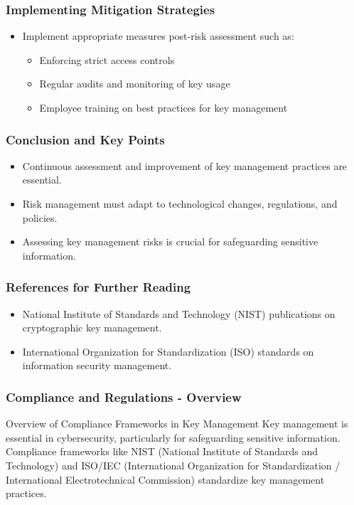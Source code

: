 \documentclass{beamer}
\begin{document}
\begin{frame}[fragile]
    \frametitle{Implementing Mitigation Strategies}
    \begin{itemize}
        \item Implement appropriate measures post-risk assessment such as:
        \begin{itemize}
            \item Enforcing strict access controls
            \item Regular audits and monitoring of key usage
            \item Employee training on best practices for key management
        \end{itemize}
    \end{itemize}
\end{frame}

\begin{frame}[fragile]
    \frametitle{Conclusion and Key Points}
    \begin{itemize}
        \item Continuous assessment and improvement of key management practices are essential.
        \item Risk management must adapt to technological changes, regulations, and policies.
        \item Assessing key management risks is crucial for safeguarding sensitive information.
    \end{itemize}
\end{frame}

\begin{frame}[fragile]
    \frametitle{References for Further Reading}
    \begin{itemize}
        \item National Institute of Standards and Technology (NIST) publications on cryptographic key management.
        \item International Organization for Standardization (ISO) standards on information security management.
    \end{itemize}
\end{frame}

\begin{frame}[fragile]
    \frametitle{Compliance and Regulations - Overview}
    \begin{block}{Overview of Compliance Frameworks in Key Management}
        Key management is essential in cybersecurity, particularly for safeguarding sensitive information. Compliance frameworks like NIST (National Institute of Standards and Technology) and ISO/IEC (International Organization for Standardization / International Electrotechnical Commission) standardize key management practices.
    \end{block}
\end{frame}
\end{document}
